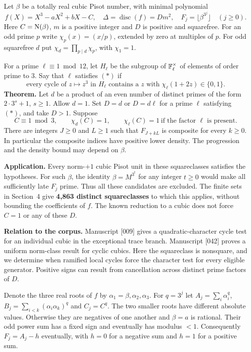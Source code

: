 \documentclass[11pt,a4paper,oneside,openany]{book}
\newcommand{\lead}[1]{\textbf{#1}\enspace}\let\para\lead
\begin{document}
Let $\beta$ be a totally real cubic Pisot number, with minimal polynomial
\[
 f(X)=X^3-aX^2+bX-C,\quad \Delta=\operatorname{disc}(f)=D m^2,
 \quad F_j=\lfloor\beta^{3^j}\rfloor\quad(j\ge0).
\]
Here $C=\operatorname{N}(\beta)$, $m$ is a positive integer and $D$ is positive and squarefree. For an odd prime $p$ write $\chi_p(x)=(x/p)$, extended by zero at multiples of $p$. For odd squarefree $d$ put $\chi_d=\prod_{p\mid d}\chi_p$, with $\chi_1=1$.

For a prime $\ell\equiv1\bmod12$, let $H_\ell$ be the subgroup of $\mathbb F_\ell^\times$ of elements of order prime to $3$. Say that $\ell$ satisfies $(*)$ if
\[
 \boxed{\ \text{every cycle of }z\mapsto z^3\text{ in }H_\ell
   \text{ contains a }z\text{ with }\chi_\ell(1+2z)\in\{0,1\}.\ }\tag{*}
\]
\lead{Theorem.} Let $d$ be a product of an even number of distinct primes of the form $2\cdot3^s+1$, $s\ge1$. Allow $d=1$. Set $D=d$ or $D=d\ell$ for a prime $\ell$ satisfying $(*)$, and take $D>1$. Suppose
\[
 C\equiv1\bmod3,\qquad \chi_d(C)=1,\qquad
 \chi_\ell(C)=1\ \text{if the factor }\ell\text{ is present}.
\]
There are integers $J\ge0$ and $L\ge1$ such that $F_{J+kL}$ is composite for every $k\ge0$. In particular the composite indices have positive lower density. The progression and the density bound may depend on $\beta$.

\lead{Application.} Every norm-$+1$ cubic Pisot unit in these squareclasses satisfies the hypotheses. For such $\beta$, the identity $\beta=M^{3^t}$ for any integer $t\ge0$ would make all sufficiently late $F_j$ prime. Thus all these candidates are excluded. The finite sets in Section~4 give \textbf{4,863 distinct squareclasses} to which this applies, without bounding the coefficients of $f$. The known reduction to a cubic does not force $C=1$ or any of these $D$.

\lead{Relation to the corpus.} Manuscript [009] gives a quadratic-character cycle test for an individual cubic in the exceptional trace branch. Manuscript [042] proves a uniform norm-class result for cyclic cubics. Here the squareclass is nonsquare, and we determine when ramified local cycles force the character test for every eligible generator. Positive signs can result from cancellation across distinct prime factors of $D$.



Denote the three real roots of $f$ by $\alpha_1=\beta,\alpha_2,\alpha_3$. For $q=3^j$ let $A_j=\sum_i\alpha_i^q$, $B_j=\sum_{i<k}(\alpha_i\alpha_k)^q$ and $C_j=C^q$. The two smaller roots have different absolute values. Otherwise they are negatives of one another and $\beta=a$ is rational. Their odd power sum has a fixed sign and eventually has modulus $<1$. Consequently $F_j=A_j-h$ eventually, with $h=0$ for a negative sum and $h=1$ for a positive sum.
\end{document}
